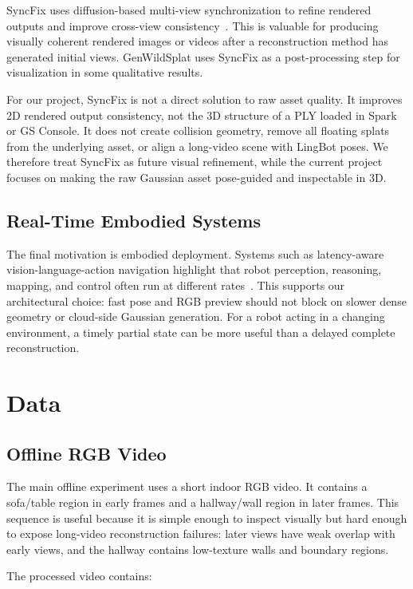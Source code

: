 \documentclass[11pt]{article}
\begin{document}
SyncFix uses diffusion-based multi-view synchronization to refine rendered outputs and improve cross-view consistency~\cite{li2026syncfix}. This is valuable for producing visually coherent rendered images or videos after a reconstruction method has generated initial views. GenWildSplat uses SyncFix as a post-processing step for visualization in some qualitative results.

For our project, SyncFix is not a direct solution to raw asset quality. It improves 2D rendered output consistency, not the 3D structure of a PLY loaded in Spark or GS Console. It does not create collision geometry, remove all floating splats from the underlying asset, or align a long-video scene with LingBot poses. We therefore treat SyncFix as future visual refinement, while the current project focuses on making the raw Gaussian asset pose-guided and inspectable in 3D.

\subsection{Real-Time Embodied Systems}

The final motivation is embodied deployment. Systems such as latency-aware vision-language-action navigation highlight that robot perception, reasoning, mapping, and control often run at different rates~\cite{huang2026ticvla}. This supports our architectural choice: fast pose and RGB preview should not block on slower dense geometry or cloud-side Gaussian generation. For a robot acting in a changing environment, a timely partial state can be more useful than a delayed complete reconstruction.

\section{Data}

\subsection{Offline RGB Video}

The main offline experiment uses a short indoor RGB video. It contains a sofa/table region in early frames and a hallway/wall region in later frames. This sequence is useful because it is simple enough to inspect visually but hard enough to expose long-video reconstruction failures: later views have weak overlap with early views, and the hallway contains low-texture walls and boundary regions.

The processed video contains:
\end{document}
